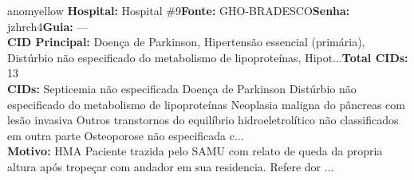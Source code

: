 \documentclass[a4paper,10pt]{article}
\begin{document}
\begin{anomalycard}[Interna\c{c}\~{a}o \#118354 | Pac. \#98198 | MODERADO (z=2.74) | LOS: 10d | 21/02/2026\,$\to$\,03/03/2026]{anomyellow}
\textbf{Hospital:} Hospital \#9\quad \textbf{Fonte:} GHO-BRADESCO\quad \textbf{Senha:} jzhrch4\quad \textbf{Guia:} ---\\

\textbf{CID Principal:} {\small Doença de Parkinson, Hipertensão essencial (primária), Distúrbio não especificado do metabolismo de lipoproteínas, Hipot...}\quad\textbf{Total CIDs:} 13\\

\textbf{CIDs:} {\scriptsize Septicemia não especificada \textbar{} Doença de Parkinson \textbar{} Distúrbio não especificado do metabolismo de lipoproteínas \textbar{} Neoplasia maligna do pâncreas com lesão invasiva \textbar{} Outros transtornos do equilíbrio hidroeletrolítico não classificados em outra parte \textbar{} Osteoporose não especificada c...}\\

\textbf{Motivo:} {\scriptsize HMA   Paciente trazida pelo SAMU com relato de queda da propria altura após tropeçar com andador em sua residencia. Refere dor ...}\\




\end{anomalycard}
\end{document}
